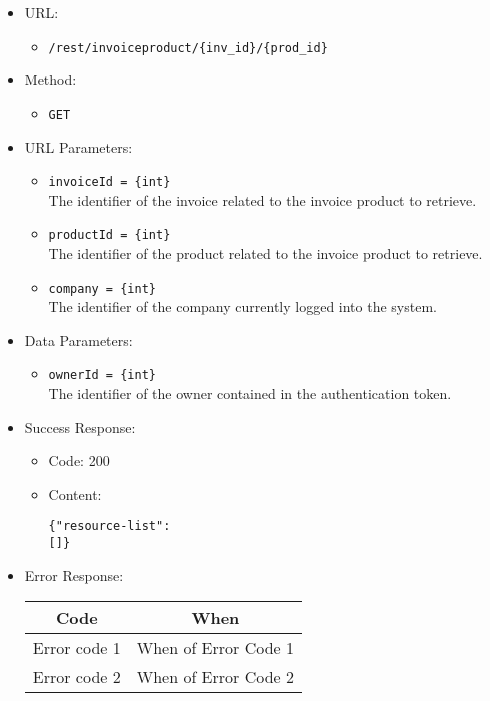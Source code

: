 \begin{itemize}
    
    \item URL: 
    \begin{itemize}
        \item \texttt{/rest/invoiceproduct/\{inv\_id\}/\{prod\_id\}}
    \end{itemize}
    
    \item Method: 
    \begin{itemize}
        \item \texttt{GET}
    \end{itemize}
    
    \item URL Parameters: 
    \begin{itemize}
        \item \texttt{invoiceId = \{int\}} \\
        The identifier of the invoice related to the invoice product to retrieve.
	\item \texttt{productId = \{int\}} \\
        The identifier of the product related to the invoice product to retrieve.
        \item \texttt{company = \{int\}} \\
        The identifier of the company currently logged into the system.   
    \end{itemize}
    
    \item Data Parameters: 
    \begin{itemize}
        \item \texttt{ownerId = \{int\}} \\
        The identifier of the owner contained in the authentication token.
    \end{itemize}
    
    \item Success Response: 
    \begin{itemize}
        \item Code: 200
        \item Content:
        \begin{lstlisting}
{"resource-list":
[]}
        \end{lstlisting}        
    \end{itemize}
    
    \item Error Response:
    \begin{table}[!h]
    \centering 
    \begin{tabular}{|c|c|}
    \hline
    \multicolumn{1}{|c|}{\textbf{Code}} & \multicolumn{1}{c|}{\textbf{When}} \\ \hline
    Error code 1 & When of Error Code 1 \\\hline
    Error code 2 & When of Error Code 2 \\\hline
    \end{tabular} 
    \end{table} 
    
\end{itemize}

